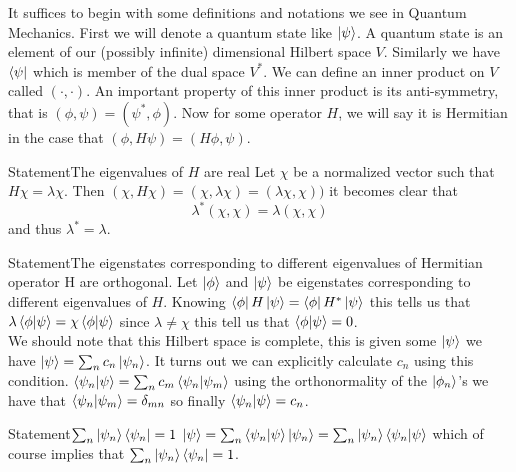 
\def\name{Daniel Tobias}
\def\assignment{Quantum Mechanics Notes}


It suffices to begin with some definitions and notations we see in Quantum Mechanics. First we will denote a quantum state like $\ket{\psi}$. A quantum state is an element of our (possibly infinite) dimensional Hilbert space $V$. Similarly we have $\bra{\psi}$ which is member of the dual space $V^{*}$. We can define an inner product on $V$ called $(\cdot, \cdot)$. An important property of this inner product is its anti-symmetry, that is $(\phi, \psi) = (\psi^{*}, \phi)$. Now for some operator $H$, we will say it is Hermitian in the case that $(\phi, H\psi) = (H\phi, \psi)$. 

\begin{problem}{Statement}{The eigenvalues of $H$ are real}
Let $\chi$ be a normalized vector such that $H\chi = \lambda \chi$. Then $(\chi, H\chi) = (\chi, \lambda \chi) = (\lambda \chi, \chi))$ it becomes clear that $$\lambda^{*}(\chi, \chi) = \lambda(\chi,\chi)$$ and thus $\lambda^{*} = \lambda$.
\end{problem}

\begin{problem}{Statement}{The eigenstates corresponding to different eigenvalues of Hermitian operator H are orthogonal.}
Let $\ket{\phi}$ and $\ket{\psi}$ be eigenstates corresponding to different eigenvalues of $H$. Knowing $\bra{\phi}H\ket{\psi} = \bra{\phi}H^{*} \ket{\psi}$ this tells us that $\lambda\bra{\phi}\ket{\psi} = \chi\bra{\phi}\ket{\psi}$ since $\lambda \neq \chi$ this tell us that $\bra{\phi}\ket{\psi} = 0$. \\

We should note that this Hilbert space is complete, this is given some $\ket{\psi}$ we have $\ket{\psi} = \sum_{n} c_{n}\ket{\psi_{n}}$. It turns out we can explicitly calculate $c_n$ using this condition. $\bra{\psi_{n}}\ket{\psi} = \sum_{n} c_{m} \bra{\psi_n}\ket{\psi_{m}}$ using the orthonormality of the $\ket{\phi_{n}}$'s we have that $\bra{\psi_{n}}\ket{\psi_{m}} = \delta_{mn}$ so finally $\bra{\psi_{n}}\ket{\psi} = c_n$.

\begin{problem}{Statement}{$\sum_{n}\ket{\psi_n}\bra{\psi_n} = 1$}
$\ket{\psi} = \sum_{n}\bra{\psi_{n}}\ket{\psi} \ket{\psi_{n}} = \sum_{n} \ket{\psi_{n}}\bra{\psi_{n}} \ket{\psi}$ which of course implies that $\sum_{n}\ket{\psi_{n}}\bra{\psi_{n}} = 1$.
\end{problem}

\end{problem}    
	

